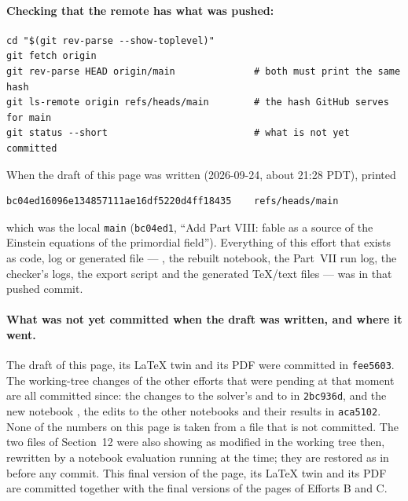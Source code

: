 {\begin{longtable}{@{}p{0.1\linewidth}p{0.1\linewidth}p{0.74\linewidth}@{}}
\bottomrule
\end{longtable}
}

\paragraph{Checking that the remote has what was pushed:}

\begin{Verbatim}
cd "$(git rev-parse --show-toplevel)"
git fetch origin
git rev-parse HEAD origin/main              # both must print the same hash
git ls-remote origin refs/heads/main        # the hash GitHub serves for main
git status --short                          # what is not yet committed
\end{Verbatim}

When the draft of this page was written (2026-09-24, about 21:28 PDT),
 printed

\begin{Verbatim}
bc04ed16096e134857111ae16df5220d4ff18435	refs/heads/main
\end{Verbatim}

which was the local \texttt{main} (\texttt{bc04ed1}, ``Add Part VIII: fable as a source of the Einstein
equations of the primordial field''). Everything of this effort that exists as code, log or generated
file --- , the rebuilt notebook, the Part~VII run log, the checker's logs, the
export script and the generated TeX/text files --- was in that pushed commit.

\paragraph{What was not yet committed when the draft was written, and where it went.} The draft of
this page, its LaTeX twin and its PDF were committed in \texttt{fee5603}. The working-tree changes of
the other efforts that were pending at that moment are all committed since: the changes to the
solver's  and to  in \texttt{2bc936d},
and the new notebook , the edits to the other notebooks and
their results in \texttt{aca5102}. None of the numbers on this page is taken from a file that is not
committed. The two  files of Section~12 were also showing as modified in the working tree
then, rewritten by a notebook evaluation running at the time; they are restored as in
 before any commit. This final version of the page, its LaTeX twin and its PDF are
committed together with the final versions of the pages of Efforts B and C.

